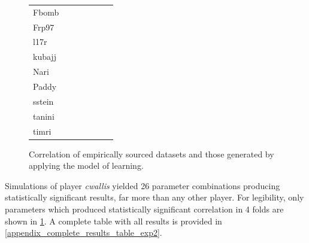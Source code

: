 \begin{figure}
\begin{tabular}{@{}l r r r r r r@{}}
Fbomb & \noparams{} \\
Frp97 & \noparams{} \\
l17r & \noparams{} \\
kubajj & \noparams{} \\
Nari & \noparams{} \\
Paddy & \noparams{} \\
sstein & \noparams{} \\
tanini & \noparams{} \\
timri & \noparams{} \\
\bottomrule
    \end{tabular}
    \caption{Correlation of empirically sourced datasets and those generated by applying the \aspectoriented model of learning.}
    \label{learning_model_results_table_comparison_to_real_world_datasets_correlating_players}
\end{figure}


Simulations of player \emph{cwallis} yielded 26 parameter combinations producing
statistically significant results, far more than any other player. For
legibility, only parameters which produced statistically significant correlation
in 4 folds are shown in
\cref{learning_model_results_table_comparison_to_real_world_datasets_correlating_players}.
A complete table with all results is provided in
\cref{appendix_complete_results_table_exp2}.


